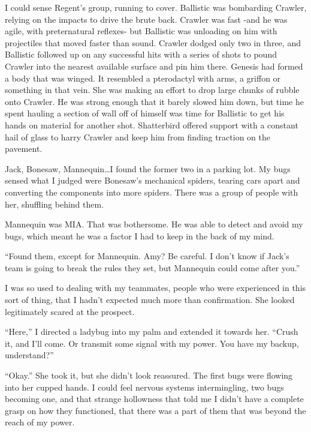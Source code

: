 I could sense Regent's group, running to cover.  Ballistic was bombarding Crawler, relying on the impacts to drive the brute back.  Crawler was fast -and he was agile, with preternatural reflexes- but Ballistic was unloading on him with projectiles that moved faster than sound.  Crawler dodged only two in three, and Ballistic followed up on any successful hits with a series of shots to pound Crawler into the nearest available surface and pin him there.  Genesis had formed a body that was winged.  It resembled a pterodactyl with arms, a griffon or something in that vein.  She was making an effort to drop large chunks of rubble onto Crawler.  He was strong enough that it barely slowed him down, but time he spent hauling a section of wall off of himself was time for Ballistic to get his hands on material for another shot.  Shatterbird offered support with a constant hail of glass to harry Crawler and keep him from finding traction on the pavement.



Jack, Bonesaw, Mannequin\ldots I found the former two in a parking lot.  My bugs sensed what I judged were Bonesaw's mechanical spiders, tearing cars apart and converting the components into more spiders.  There was a group of people with her, shuffling behind them.



Mannequin was MIA.  That was bothersome.  He was able to detect and avoid my bugs, which meant he was a factor I had to keep in the back of my mind.



``Found them, except for Mannequin.  Amy?  Be careful.  I don't know if Jack's team is going to break the rules they set, but Mannequin could come after you.''



I was so used to dealing with my teammates, people who were experienced in this sort of thing, that I hadn't expected much more than confirmation.  She looked legitimately scared at the prospect.



``Here,'' I directed a ladybug into my palm and extended it towards her.  ``Crush it, and I'll come.  Or transmit some signal with my power.  You have my backup, understand?''



``Okay.''  She took it, but she didn't look reassured.  The first bugs were flowing into her cupped hands.  I could feel nervous systems intermingling, two bugs becoming one, and that strange hollowness that told me I didn't have a complete grasp on how they functioned, that there was a part of them that was beyond the reach of my power.



